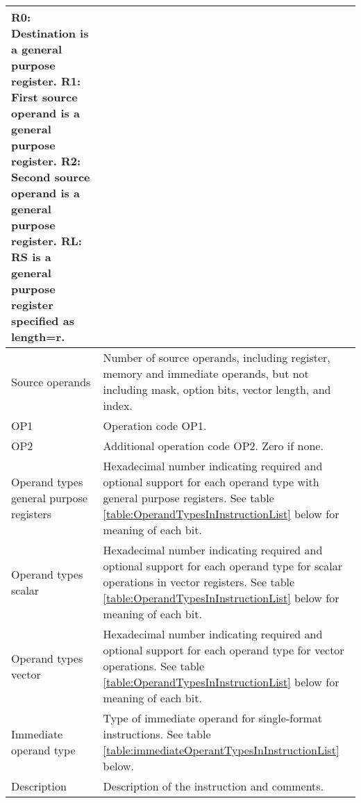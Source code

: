 \documentclass[forwardcom.tex]{subfiles}
\begin{document}
\begin{longtable} {|p{18mm}|p{100mm}|}
R0:  Destination is a general purpose register.\newline
R1:  First source operand is a general purpose register.\newline
R2:  Second source operand is a general purpose register.\newline
RL:  RS is a general purpose register specified as length=r.
\\ \hline
Source operands & Number of source operands, including register, memory and immediate operands, but not including mask, option bits, vector length, and index. \\
\hline
OP1 & Operation code OP1. \\
\hline
OP2 & Additional operation code OP2. Zero if none. \\
\hline
Operand types general purpose registers & Hexadecimal number indicating required and optional support for each operand type with general purpose registers. See table \ref{table:OperandTypesInInstructionList} below for meaning of each bit. \\
\hline
Operand types scalar & Hexadecimal number indicating required and optional support for each operand type for scalar operations in vector registers. See table \ref{table:OperandTypesInInstructionList} below for meaning of each bit. \\
\hline
Operand types vector & Hexadecimal number indicating required and optional support for each operand type for vector operations. See table \ref{table:OperandTypesInInstructionList} below for meaning of each bit. \\
\hline
Immediate operand type & Type of immediate operand for single-format instructions. See table \ref{table:immediateOperantTypesInInstructionList} below. \\
\hline
Description & Description of the instruction and comments. \\
\hline
\end{longtable}
\end{document}
